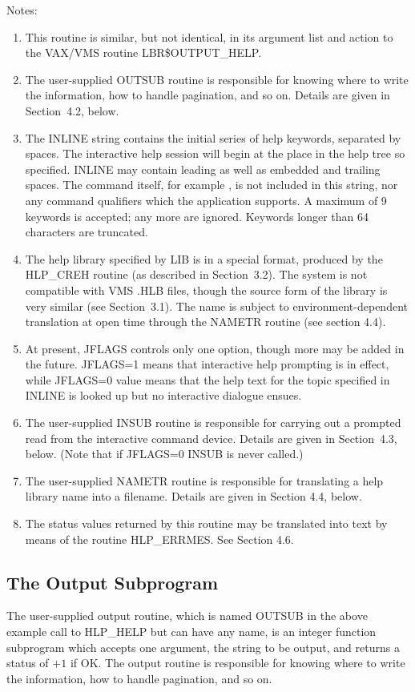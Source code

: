 Notes:
\nopagebreak
\begin{enumerate}
\item This routine is similar, but not identical, in its argument list
and action to the VAX/VMS routine LBR\$OUTPUT\_HELP.
\item The user-supplied OUTSUB routine is responsible for
knowing where to
write the information, how to handle pagination, and so on.  Details
are given in Section~4.2, below.
\item The INLINE string contains the initial series of help keywords,
separated by spaces.  The interactive help session will begin at the
place in the help tree so specified.  INLINE may contain leading as well as
embedded and trailing spaces.  The command itself, for example
, is not included in this string, nor any command
qualifiers which the application supports.  A maximum of 9 keywords is
accepted;  any more are ignored.  Keywords longer than 64 characters
are truncated.
\item The help library specified by LIB is in a special format, produced by
the HLP\_CREH routine
(as described in Section~3.2).  The system is not compatible with
VMS .HLB files, though the source form of the library is very
similar (see Section~3.1).  The name is subject to environment-dependent
translation at open time through the NAMETR routine (see
section 4.4).
\item At present, JFLAGS controls only one option, though more
may be added in the future.  JFLAGS=1 means that
interactive help prompting is in effect, while JFLAGS=0
value means that the help text for the topic specified in
INLINE is looked up but no interactive dialogue ensues.
\item The user-supplied INSUB routine is responsible for
carrying out a prompted read from the interactive command device.
Details are given in Section~4.3, below. (Note that if JFLAGS=0
INSUB is never called.)
\item The user-supplied NAMETR routine is responsible for translating
a help library name into a filename.  Details are given in Section 4.4,
below.
\item The status values returned by this routine may be translated into
text by means of the routine HLP\_ERRMES.  See Section 4.6.
\end{enumerate}

\subsection{The Output Subprogram}
The user-supplied output routine, which is named OUTSUB in the above
example call to HLP\_HELP but can have any name,
is an integer function subprogram which
accepts one argument, the string to be output, and returns a
status of $+1$ if OK.  The output routine is responsible for knowing where to
write the information, how to handle pagination, and so on.

